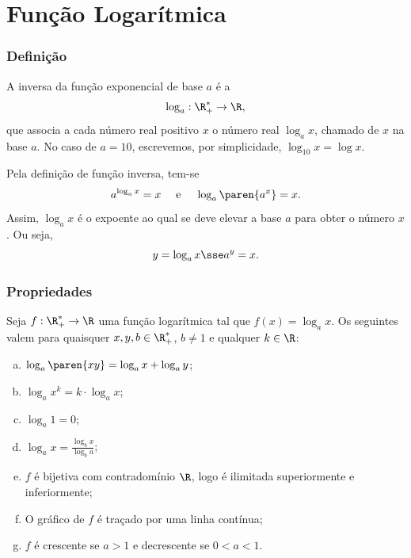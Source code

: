 \documentclass[10pt]{beamer}
\begin{document}
\section{Função Logarítmica}
\begin{frame}
\frametitle{Definição} 
\begin{definicao}
A inversa da função exponencial de base $a$ é a 
$$\log_a : \R_+^\ast \to \R,$$
que associa a cada número real positivo $x$ o número real $\log_a
x$, chamado  de $x$ na base $a$. No caso de $a=10$,
escrevemos, por simplicidade, $\log_{10}x = \log
 x$.
\end{definicao}\pause
Pela definição de função inversa, tem-se
$$ a^{\log_a x}=x \ \ \ \text{ e } \ \ \ \log_a \paren{a^x} = x.$$
Assim, $\log_a x $ é o expoente ao qual se deve elevar a base $a$
para obter o número $x$. Ou seja,
$$ y = \log_a x \sse a^y = x.$$

\end{frame}


\begin{frame}
\frametitle{Propriedades} 

\begin{proposicao}
Seja $f: \R_+^\ast \to \R$ uma função logarítmica tal que $f(x) =
\log_a x$. Os seguintes valem para quaisquer  $x, y, b \in
\R_+^\ast$, $b \neq 1$ e qualquer $k \in \R$:
\begin{enumerate}[(a)]
	\item $\log_a \paren{xy} = \log_a x + \log_a y$;
	\item $\log_a x^k = k\cdot \log_a x$;
	\item $\log_a 1 = 0$;
	\item $\log_a x = \frac{\log_b x}{\log_b a}$;
	\item $f$ é bijetiva com contradomínio $\R$, logo é ilimitada superiormente e inferiormente;
	\item O gráfico de $f$ é traçado por uma linha contínua;
	\item $f$ é crescente se $a>1$ e decrescente se $0<a<1$.
\end{enumerate}
\end{proposicao}


\end{frame}
\end{document}
